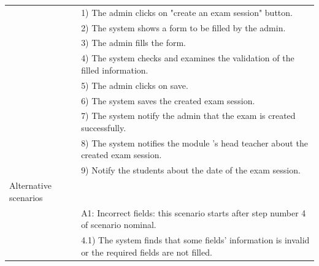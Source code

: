 \documentclass[]{uc2pfecaneva}
\begin{document}
\begin{table}[t]
\begin{tabularx}{\textwidth}{|l|X|}
            & 1) The admin clicks on "create an exam session" button.                                                                                                           \\
            & 2) The system shows a form to be filled by the admin.                                                                                                             \\
            & 3) The admin fills the form.                                                                                                                                      \\
            & 4) The system checks and examines the validation of the filled information.                                                                                       \\
            & 5) The admin clicks on save.                                                                                                                                      \\
            & 6) The system saves the created exam session.                                                                                                                     \\
            & 7) The system notify the admin that the exam is created successfully.                                                                                             \\
            & 8) The system notifies the module 's head teacher about the created exam session.                                                                                 \\
            & 9) Notify the students about the date of the exam session.                                                                                                        \\ \hline
            Alternative scenarios &                                                                                                                                                                   \\
            & A1: Incorrect fields: this scenario starts after step number 4 of scenario nominal.                                                                               \\
            & \hspace{4mm}4.1) The system finds that some fields' information is invalid or the required fields are not filled.                                                 \\

\end{tabularx}
\end{table}
\end{document}
